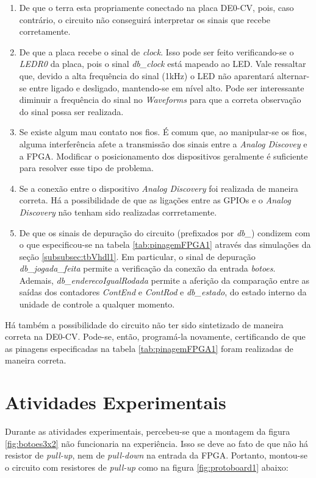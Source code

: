 \documentclass[amsmath,amssymb,floatfix]{report}
\begin{document}
\begin{enumerate}
    \item De que o terra esta propriamente conectado na placa DE0-CV, pois, caso contrário, o circuito não conseguirá interpretar os sinais que recebe corretamente.
   \item De que a placa recebe o sinal de \textit{clock}. Isso pode ser feito verificando-se o \textit{LEDR0} da placa, pois o sinal \textit{db\_clock} está mapeado ao LED. Vale ressaltar que, devido a alta frequência do sinal (1kHz) o LED não aparentará alternar-se entre ligado e desligado, mantendo-se em nível alto. Pode ser interessante diminuir a frequência do sinal no \textit{Waveforms} para que a correta observação do sinal possa ser realizada.
   \item Se existe algum mau contato nos fios. É comum que, ao manipular-se os fios, alguma interferência afete a transmissão dos sinais entre a \textit{Analog Discovey} e a FPGA. Modificar o posicionamento dos dispositivos geralmente é suficiente para resolver esse tipo de problema. 
   \item Se a conexão entre o dispositivo \textit{Analog Discovery} foi realizada de maneira correta. Há a possibilidade de que as ligações entre as GPIOs e o \textit{Analog Discovery} não tenham sido realizadas corrretamente.
   \item De que os sinais de depuração do circuito (prefixados por \textit{db\_}) condizem com o que especificou-se na tabela \ref{tab:pinagemFPGA1} através das simulações da seção \ref{subsubsec:tbVhdl1}. Em particular, o sinal de depuração \textit{db\_jogada\_feita} permite a verificação da conexão da entrada \textit{botoes}. Ademais, \textit{db\_enderecoIgualRodada} permite a aferição da comparação entre as saídas dos contadores \textit{ContEnd} e \textit{ContRod} e \textit{db\_estado}, do estado interno da unidade de controle a qualquer momento.
\end{enumerate}

Há também a possibilidade do circuito não ter sido sintetizado de maneira correta na DE0-CV. Pode-se, então, programá-la novamente, certificando de que as pinagens especificadas na tabela \ref{tab:pinagemFPGA1} foram realizadas de maneira correta.

\section{Atividades Experimentais}
\label{sec:exp}

Durante as atividades experimentais, percebeu-se que a montagem da figura \ref{fig:botoes3x2} não funcionaria na experiência. Isso se deve ao fato de que não há resistor de \textit{pull-up}, nem de \textit{pull-down} na entrada da FPGA. Portanto, montou-se o circuito com resistores de \textit{pull-up} como na figura \ref{fig:protoboard1} abaixo:
\end{document}
